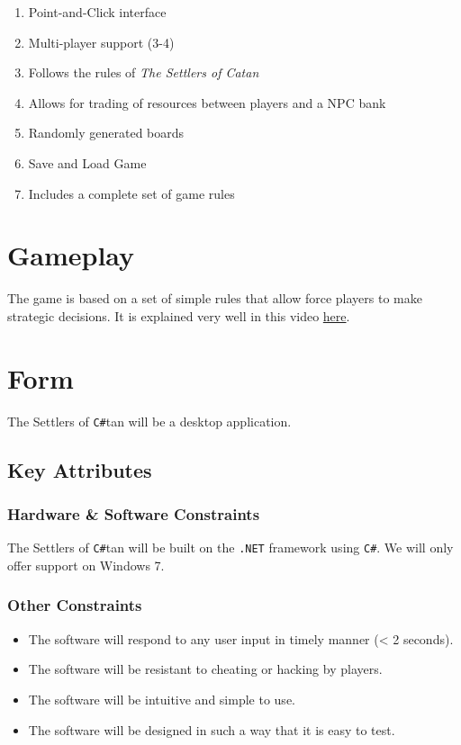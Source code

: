 \documentclass[12pt]{article}
\begin{document}
\begin{enumerate}

\item Point-and-Click interface
\item Multi-player support (3-4)
\item Follows the rules of \emph{The Settlers of Catan}
\item Allows for trading of resources between players and a NPC bank
\item Randomly generated boards
\item Save and Load Game
\item Includes a complete set of game rules

\end{enumerate}

\section{Gameplay}
The game is based on a set of simple rules that allow force players to make strategic decisions. It is explained very well in this video \href{http://www.youtube.com/watch?v=FURoYf5IXRA&feature=player_embedded#!}{here}.

\section{Form}
The Settlers of \verb!C#!tan will be a desktop application.

\subsection{Key Attributes}

\subsubsection{Hardware \& Software Constraints}
 The Settlers of \verb!C#!tan will be built on the \verb!.NET! framework using \verb!C#!. We will only offer support on Windows 7.

\subsubsection{Other Constraints}
\begin{itemize}
\item The software will respond to any user input in timely manner (< 2 seconds).
\item The software will be resistant to cheating or hacking by players.
\item The software will be intuitive and simple to use.
\item The software will be designed in such a way that it is easy to test.
\end{itemize}
\end{document}
